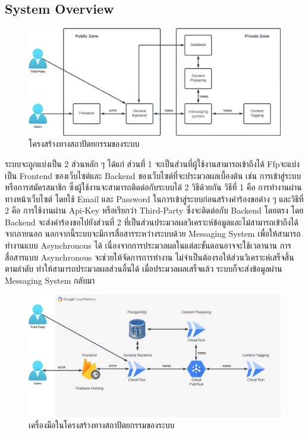 \documentclass[12pt,oneside,openright,a4paper]{cpe-thai-project}
\begin{document}
\subsection{System Overview}
  \begin{figure}[!ht]\centering
    \includegraphics[width=\textwidth]{./img/architechture_simple.png}
    \caption{โครงสร้างทางสถาปัตยกรรมของระบบ}\label{fig:architecture_simple} 
  \end{figure}
  \newpage
  \hspace{1cm}ระบบจะถูกแบ่งเป็น 2 ส่วนหลัก ๆ ได้แก่ ส่วนที่ 1 จะเป็นส่วนที่ผู้ใช้งานสามารถเข้าถึงได้ 
  Ffpจะแบ่งเป็น Frontend ของเว็บไซต์และ Backend ของเว็บไซต์ที่จะประมวลผลเบื้องต้น เช่น การเข้าสู่ระบบหรือการสมัครสมาชิก 
  ซึ่งผู้ใช้งานจะสามารถติดต่อกับระบบได้ 2 วิธีด้วยกัน วิธีที่ 1 คือ การทำงานผ่านทางหน้าเว็บไซต์ โดยใช้ Email และ Password ในการเข้าสู่ระบบก่อนสร้างคำร้องขอต่าง ๆ 
  และวิธีที่ 2 คือ การใช้งานผ่าน Api-Key หรือเรียกว่า Third-Party ซึ่งจะติดต่อกับ Backend โดยตรง 
  โดย Backend จะส่งคำร้องขอไปยังส่วนที่ 2 ที่เป็นส่วนประมวลผลวิเคราะห์ข้อมูลและไม่สามารถเข้าถึงได้จากภายนอก 
  นอกจากนี้ระบบจะมีการสื่อสารระหว่างระบบด้วย Messaging System เพื่อให้สามารถทำงานแบบ Asynchronous ได้ 
  เนื่องจากการประมวลผลในแต่ละขั้นตอนอาจจะใช้เวลานาน การสื่อสารแบบ Asynchronous จะช่วยให้จัดการการทำงาน ไม่จำเป็นต้องรอให้ส่วนวิเคราะห์เสร็จสิ้นตามลำดับ 
  ทำให้สามารถประมวลผลส่วนอื่นได้ เมื่อประมวลผลเสร็จแล้ว ระบบก็จะส่งข้อมูลผ่าน Messaging System กลับมา
  \begin{figure}[!ht]\centering
    \includegraphics[width=\textwidth]{./img/architechture.png}
    \caption{เครื่องมือในโครงสร้างทางสถาปัตยกรรมของระบบ}\label{fig:architecture} 
  \end{figure}
  
\end{document}
